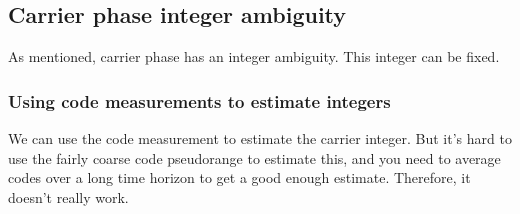 \subsection{Carrier phase integer ambiguity}
As mentioned, carrier phase has an integer ambiguity. This integer can be fixed.

\subsubsection{Using code measurements to estimate integers}
We can use the code measurement to estimate the carrier integer. But it's hard to use the fairly coarse code pseudorange to estimate this, and you need to average codes over a long time horizon to get a good enough estimate. Therefore, it doesn't really work.
